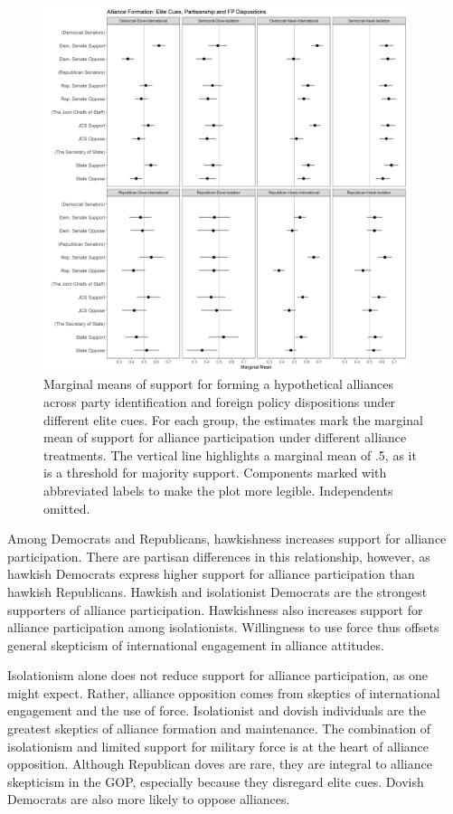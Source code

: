 \documentclass[12pt]{article}
\begin{document}
\begin{figure}[htpb]
	\centering
		\includegraphics[width=0.95\textwidth]{../figures/party-dispo-form-el.png}
	\caption{Marginal means of support for forming a hypothetical alliances across party identification and foreign policy dispositions under different elite cues. For each group, the estimates mark the marginal mean of support for alliance participation under different alliance treatments. The vertical line highlights a marginal mean of .5, as it is a threshold for majority support. Components marked with abbreviated labels to make the plot more legible. Independents omitted.}
	\label{fig:party-dispo-form-el}
\end{figure}


Among Democrats and Republicans, hawkishness increases support for alliance participation. 
There are partisan differences in this relationship, however, as hawkish Democrats express higher support for alliance participation than hawkish Republicans. 
Hawkish and isolationist Democrats are the strongest supporters of alliance participation. 
Hawkishness also increases support for alliance participation among isolationists. 
Willingness to use force thus offsets general skepticism of international engagement in alliance attitudes. 


Isolationism alone does not reduce support for alliance participation, as one might expect.
Rather, alliance opposition comes from skeptics of international engagement and the use of force. 
Isolationist and dovish individuals are the greatest skeptics of alliance formation and maintenance. 
The combination of isolationism and limited support for military force is at the heart of alliance opposition. 
Although Republican doves are rare, they are integral to alliance skepticism in the GOP, especially because they disregard elite cues. 
Dovish Democrats are also more likely to oppose alliances.  
\end{document}
